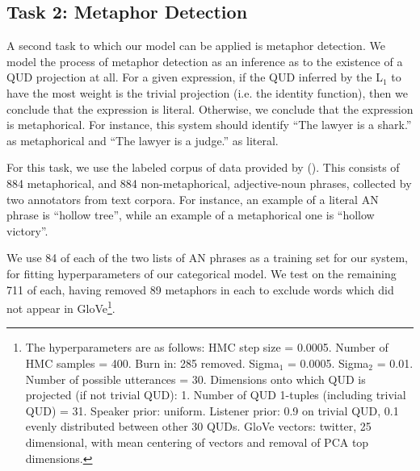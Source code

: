 \documentclass[10pt,letterpaper,twocolumn]{article}
\begin{document}




\subsection{Task 2: Metaphor Detection}

A second task to which our model can be applied is metaphor detection. We model the process of metaphor detection as an inference as to the existence of a QUD projection at all. For a given expression, if the QUD inferred by the L$_1$ to have the most weight is the trivial projection (i.e. the identity function), then we conclude that the expression is literal. Otherwise, we conclude that the expression is metaphorical. For instance, this system should identify ``The lawyer is a shark.'' as metaphorical and ``The lawyer is a judge.'' as literal.

For this task, we use the labeled corpus of data provided by (\cite{tsvetkov2014metaphor}). This consists of 884 metaphorical, and 884 non-metaphorical, adjective-noun phrases, collected by two annotators from text corpora. For instance, an example of a literal AN phrase is ``hollow tree'', while an example of a metaphorical one is ``hollow victory''.

We use 84 of each of the two lists of AN phrases as a training set for our system, for fitting hyperparameters of our categorical model. We test on the remaining 711 of each, having removed 89 metaphors in each to exclude words which did not appear in GloVe\footnote{The hyperparameters are as follows: HMC step size = 0.0005. Number of HMC samples = 400. Burn in: 285 removed. Sigma$_1$ = 0.0005. Sigma$_2$ = 0.01. Number of possible utterances = 30. Dimensions onto which QUD is projected (if not trivial QUD): 1. Number of QUD 1-tuples (including trivial QUD) = 31. Speaker prior: uniform. Listener prior: 0.9 on trivial QUD, 0.1 evenly distributed between other 30 QUDs. GloVe vectors: twitter, 25 dimensional, with mean centering of vectors and removal of PCA top dimensions.}.
\end{document}
